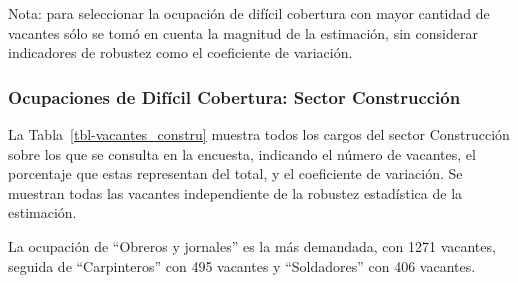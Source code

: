 \documentclass[
  11pt,
]{article}
\begin{document}
Nota: para seleccionar la ocupación de difícil cobertura con mayor
cantidad de vacantes sólo se tomó en cuenta la magnitud de la
estimación, sin considerar indicadores de robustez como el coeficiente
de variación. \newpage

\subsubsection{Ocupaciones de Difícil Cobertura: Sector
Construcción}\label{ocupaciones-de-difuxedcil-cobertura-sector-construcciuxf3n}

La Tabla~\ref{tbl-vacantes_constru} muestra todos los cargos del sector
Construcción sobre los que se consulta en la encuesta, indicando el
número de vacantes, el porcentaje que estas representan del total, y el
coeficiente de variación. Se muestran todas las vacantes independiente
de la robustez estadística de la estimación.

La ocupación de ``Obreros y jornales'' es la más demandada, con 1271
vacantes, seguida de ``Carpinteros'' con 495 vacantes y ``Soldadores''
con 406 vacantes.
\end{document}

